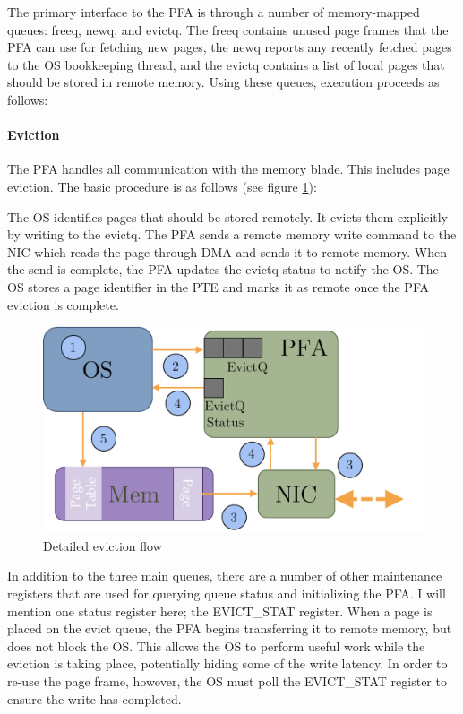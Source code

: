 The primary interface to the PFA is through a number of memory-mapped queues:
\gls{freeq}, \gls{newq}, and \gls{evictq}. The \gls{freeq} contains unused page
frames that the PFA can use for fetching new pages, the \gls{newq} reports any
recently fetched pages to the OS bookkeeping thread, and the \gls{evictq}
contains a list of local pages that should be stored in remote memory. Using
these queues, execution proceeds as follows:

\paragraph{Eviction}
The PFA handles all communication with the memory blade. This includes page
eviction. The basic procedure is as follows (see figure \ref{fig:evict_detail}):

\begin{outline}[enumerate]
    \1 The OS identifies pages that should be stored remotely.
    \1 It evicts them explicitly by writing to the \gls{evictq}.
    \1 The PFA sends a remote memory write command to the NIC which reads the
    page through DMA and sends it to remote memory.
    \1 When the send is complete, the PFA updates the \gls{evictq} status to
    notify the OS.
    \1 The OS stores a page identifier in the PTE and marks it as remote once
    the PFA eviction is complete.
\end{outline}

\begin{figure}[h] \centering
  \includegraphics[width=0.7\columnwidth]{figs/pfa_evict_detail.pdf}
  \caption{Detailed eviction flow}
  \label{fig:evict_detail}
\end{figure}

In addition to the three main queues, there are a number of other maintenance
registers that are used for querying queue status and initializing the PFA. I
will mention one status register here; the EVICT\_STAT register. When a page is
placed on the evict queue, the PFA begins transferring it to remote memory, but
does not block the OS. This allows the OS to perform useful work while the
eviction is taking place, potentially hiding some of the write latency. In
order to re-use the page frame, however, the OS must poll the EVICT\_STAT
register to ensure the write has completed.

